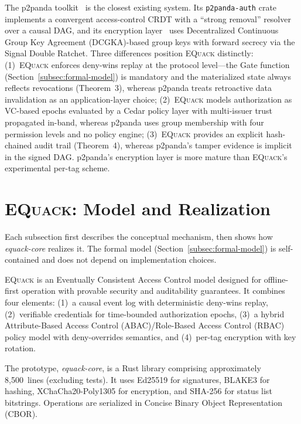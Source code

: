 \documentclass[10pt,journal,compsoc]{IEEEtran}
\newcommand{\equack}{\textsc{EQuack}}
\begin{document}
The p2panda toolkit~\cite{p2panda2024} is the closest existing system. Its \texttt{p2panda-auth} crate~\cite{p2panda_auth2025} implements a convergent access-control CRDT with a ``strong removal'' resolver over a causal DAG, and its encryption layer~\cite{p2panda_encryption2025} uses Decentralized Continuous Group Key Agreement (DCGKA)-based group keys with forward secrecy via the Signal Double Ratchet. Three differences position \equack{} distinctly: (1)~\equack{} enforces deny-wins replay at the protocol level---the Gate function (Section~\ref{subsec:formal-model}) is mandatory and the materialized state always reflects revocations (Theorem~3), whereas p2panda treats retroactive data invalidation as an application-layer choice; (2)~\equack{} models authorization as VC-based epochs evaluated by a Cedar policy layer with multi-issuer trust propagated in-band, whereas p2panda uses group membership with four permission levels and no policy engine; (3)~\equack{} provides an explicit hash-chained audit trail (Theorem~4), whereas p2panda's tamper evidence is implicit in the signed DAG. p2panda's encryption layer is more mature than \equack{}'s experimental per-tag scheme.

\section{\equack{}: Model and Realization}
\label{sec:ecac-model}

Each subsection first describes the conceptual mechanism, then
shows how \textit{equack-core} realizes it. The formal model
(Section~\ref{subsec:formal-model}) is self-contained and does not depend on
implementation choices.

\equack{} is an Eventually Consistent Access Control model designed for offline-first operation with provable security and auditability guarantees.
It combines four elements: (1)~a causal event log with deterministic deny-wins replay, (2)~verifiable credentials for time-bounded authorization epochs, (3)~a hybrid Attribute-Based Access Control (ABAC)/Role-Based Access Control (RBAC) policy model with deny-overrides semantics, and (4)~per-tag encryption with key rotation.

The prototype, \textit{equack-core}, is a Rust library comprising approximately 8,500~lines (excluding tests). It uses Ed25519 for signatures, BLAKE3 for hashing, XChaCha20-Poly1305 for encryption, and SHA-256 for status list bitstrings. Operations are serialized in Concise Binary Object Representation (CBOR).
\end{document}
